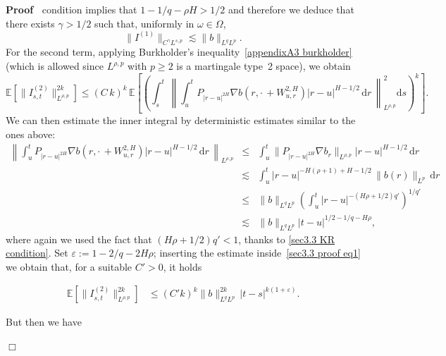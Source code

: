 \documentclass[10pt]{article}
\newcommand{\assign}{:=}
\newcommand{\mathd}{\mathrm{d}}
\newenvironment{proof}{\noindent\textbf{Proof\ }}{\hspace*{\fill}$\Box$\medskip}
\begin{document}
\begin{proof}
{{  condition}} implies that $1 - 1 / q - \rho H > 1 / 2$ and therefore we
  deduce that there exists $\gamma > 1 / 2$ such that, uniformly in $\omega
  \in \Omega$,
  \begin{equation}
    \| I^{(1)} \|_{C^{\gamma} L^{s, p}} \lesssim \| b \|_{L^q L^p}
    \label{sec3.3 proof eq0} .
  \end{equation}
  For the second term, applying Burkholder's inequality~{\eqref{appendixA3
  burkholder}} (which is allowed since $L^{\rho, p}$ with $p \geqslant 2$ is a
  martingale type~2 space), we obtain
  \begin{equation}
    \mathbb{E} [\| I^{(2)}_{s, t} \|_{L^{\rho, p}}^{2 k}] \leqslant \left( C
    \, k \right)^k \, \mathbb{E} \left[ \left( \int_s^t \, \left\| \int_u^t
    P_{| r - u |^{2 H}} \nabla b \left( r, \cdot \, + W^{2, H}_{u, r} \right)
    | r - u |^{H - 1 / 2} \, \mathd r \, \right\|^2_{L^{\rho, p}} \mathd s
    \right)^k \right] \label{sec3.3 proof eq1} .
  \end{equation}
  We can then estimate the inner integral by deterministic estimates similar
  to the ones above:
  \begin{eqnarray*}
    \left\| \int_u^t P_{| r - u |^{2 H}} \nabla b \left( r, \cdot \, + W^{2,
    H}_{u, r} \right) | r - u |^{H - 1 / 2} \, \mathd r \, \right\|_{L^{\rho,
    p}} & \leqslant & \int_u^t \| P_{| r - u |^{2 H}} \nabla b_r \|_{L^{\rho,
    p}} | r - u |^{H - 1 / 2} \, \mathd r\\
    & \lesssim & \int_u^t | r - u |^{- H (\rho + 1) + H - 1 / 2} \, \| b
    (r) \|_{L^p} \, \mathd r\\
    & \leqslant & \| b \|_{L^q L^p}  \left( \int_u^t | r - u |^{- (H \rho + 1
    / 2) q'} \right)^{1 / q'}\\
    & \lesssim & \| b \|_{L^q L^p}  | t - u |^{1 / 2 - 1 / q - H \rho},
  \end{eqnarray*}
  where again we used the fact that $(H \rho + 1 / 2) q' < 1$, thanks to
  {\eqref{sec3.3 KR condition}}. Set $\varepsilon \assign 1 - 2 / q - 2 H
  \rho$; inserting the estimate inside~{\eqref{sec3.3 proof eq1}} we obtain
  that, for a suitable $C' > 0$, it holds
  
  \begin{align}
    \mathbb{E} [\| I^{(2)}_{s, t} \|_{L^{\rho, p}}^{2 k}] & \leqslant (C' k)^k
    \| b \|^{2 k}_{L^q L^p} \, | t - s |^{k (1 + \varepsilon)} .
  \end{align}
  
  But then we have
  

\end{proof}
\end{document}
